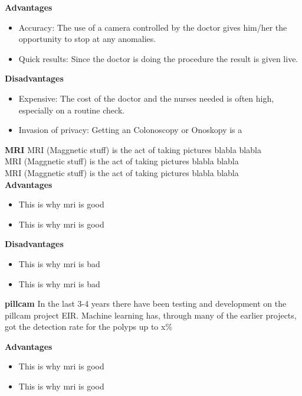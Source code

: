 	\textbf{Advantages}
	  \begin{itemize}
	    \item Accuracy: The use of a camera controlled by the doctor gives him/her the opportunity to stop at any anomalies.
	    \item Quick results: Since the doctor is doing the procedure the result is given live.
	  \end{itemize}

	\vspace{5px}
	\textbf{Disadvantages}
	  \begin{itemize}
	    \item Expensive: The cost of the doctor and the nurses needed is often high, especially on a routine check.
	    \item Invasion of privacy: Getting an Colonoscopy or Onoskopy is a %
	  \end{itemize}
	
    \vspace{10px}
	\textbf{MRI}
	MRI (Maggnetic stuff) is the act of taking pictures blabla blabla\\
	MRI (Maggnetic stuff) is the act of taking pictures blabla blabla\\
	MRI (Maggnetic stuff) is the act of taking pictures blabla blabla\\
	
	\textbf{Advantages}
	  \begin{itemize}
	    \item This is why mri is good %
	    \item This is why mri is good %
	  \end{itemize}

	\vspace{5px}
	\textbf{Disadvantages}
	  \begin{itemize}
	    \item This is why mri is bad %
	    \item This is why mri is bad %
	  \end{itemize}
    \vspace{10px}
	\textbf{pillcam}
	In the last 3-4 years there have been testing and development on the pillcam project EIR. Machine learning has, through 
	many of the earlier projects, got the detection rate for the polyps up to x\% %
	
	\textbf{Advantages}
	  \begin{itemize}
	    \item This is why mri is good %
	    \item This is why mri is good %
	  \end{itemize}


